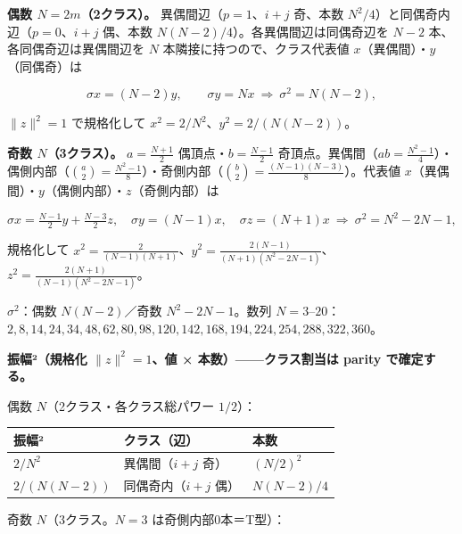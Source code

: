 \documentclass[
  a4paper,
]{ltjsarticle}
\newcounter{none} %
\begin{document}
\textbf{偶数 \(N=2m\)（2クラス）。} 異偶間辺（\(p=1\)、\(i+j\) 奇、本数
\(N^2/4\)）と同偶奇内辺（\(p=0\)、\(i+j\) 偶、本数
\(N(N-2)/4\)）。各異偶間辺は同偶奇辺を \(N-2\)
本、各同偶奇辺は異偶間辺を \(N\) 本隣接に持つので、クラス代表値
\(x\)（異偶間）・\(y\)（同偶奇）は

\[\sigma x=(N-2)y,\qquad \sigma y=Nx\ \Longrightarrow\ \sigma^2=N(N-2),\]

\(\|z\|^2=1\) で規格化して \(x^2=2/N^2\)、\(y^2=2/(N(N-2))\)。

\textbf{奇数 \(N\)（3クラス）。} \(a=\tfrac{N+1}2\)
偶頂点・\(b=\tfrac{N-1}2\)
奇頂点。異偶間（\(ab=\tfrac{N^2-1}4\)）・偶側内部（\(\binom a2=\tfrac{N^2-1}8\)）・奇側内部（\(\binom b2=\tfrac{(N-1)(N-3)}8\)）。代表値
\(x\)（異偶間）・\(y\)（偶側内部）・\(z\)（奇側内部）は

\[\sigma x=\tfrac{N-1}2y+\tfrac{N-3}2z,\quad \sigma y=(N-1)x,\quad \sigma z=(N+1)x\ \Longrightarrow\ \sigma^2=N^2-2N-1,\]

規格化して
\(x^2=\tfrac{2}{(N-1)(N+1)}\)、\(y^2=\tfrac{2(N-1)}{(N+1)(N^2-2N-1)}\)、\(z^2=\tfrac{2(N+1)}{(N-1)(N^2-2N-1)}\)。

\textbf{\(\sigma^2\)}：偶数 \(N(N-2)\)／奇数 \(N^2-2N-1\)。数列
\(N=3\)--\(20\)：\(2,8,14,24,34,48,62,80,98,120,142,168,194,224,254,288,322,360\)。

\textbf{振幅²（規格化 \(\|z\|^2=1\)、値 × 本数）------クラス割当は
parity で確定する。}

偶数 \(N\)（2クラス・各クラス総パワー \(1/2\)）：

{\def\LTcaptype{none} %
\begin{longtable}[]{@{}lll@{}}
\toprule\noalign{}
振幅² & クラス（辺） & 本数 \\
\midrule\noalign{}
\endhead
\bottomrule\noalign{}
\endlastfoot
\(2/N^2\) & 異偶間（\(i+j\) 奇） & \((N/2)^2\) \\
\(2/(N(N-2))\) & 同偶奇内（\(i+j\) 偶） & \(N(N-2)/4\) \\
\end{longtable}
}

奇数 \(N\)（3クラス。\(N=3\) は奇側内部0本＝T型）：
\end{document}
